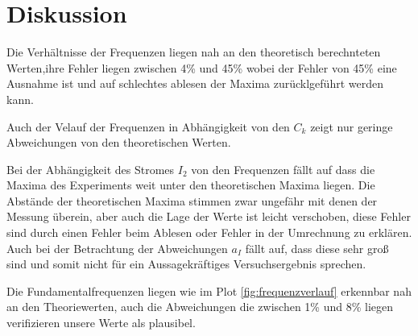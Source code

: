 \newpage
\section{Diskussion}
Die Verhältnisse der Frequenzen liegen nah an den theoretisch berechnteten Werten,ihre Fehler liegen zwischen 4\% und 45\% wobei der Fehler von 45\% eine Ausnahme ist und auf schlechtes ablesen der Maxima zurücklgeführt werden kann.

Auch der Velauf der Frequenzen in Abhängigkeit von den $C_k$ zeigt nur geringe Abweichungen von den theoretischen Werten.

Bei der Abhängigkeit des Stromes $I_2$ von den Frequenzen fällt auf dass die Maxima des Experiments weit unter den theoretischen Maxima liegen.
Die Abstände der theoretischen Maxima stimmen zwar ungefähr mit denen der Messung überein, aber auch die Lage der Werte ist leicht verschoben,
diese Fehler sind durch einen Fehler beim Ablesen oder Fehler in der Umrechnung zu erklären.
Auch bei der Betrachtung der Abweichungen $a_I$ fällt auf, dass diese sehr groß sind und somit nicht für ein Aussagekräftiges Versuchsergebnis sprechen.

Die Fundamentalfrequenzen liegen wie im Plot \ref{fig:frequenzverlauf} erkennbar nah an den Theoriewerten, auch die Abweichungen die zwischen 1\% und 8\% liegen verifizieren unsere Werte als plausibel.

\label{sec:Diskussion}

